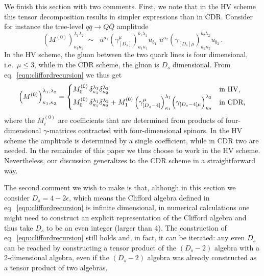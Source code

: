 We finish this section with two comments. First, we note that in the
HV scheme this tensor decomposition results in simpler expressions
than in CDR. Consider for instance the tree-level $q\bar q\to Q\bar
Q$ amplitude
\begin{equation}
  \left(M^{(0)}\right)_{\kappa_1 \kappa_2}^{\lambda_1 \lambda_2}
  \;\sim\;\; 
  \bar u^{a_1}
  \left(
  \gamma_{[D_s]}^\mu
  \right)_{a_1 \kappa_1}^{b_1 \lambda_1}
  u_{b_1}
  \,\,
  \bar u^{a_2}
  \left(
  \gamma_{[D_s]\mu}
  \right)_{a_2 \kappa_2}^{b_2 \lambda_2}
  u_{b_2}
  \,.
\end{equation}
In the HV scheme, the gluon between the two quark lines is
four dimensional, i.e.\  $\mu\leq3$, while
in the CDR scheme, the gluon is $D_s$ dimensional.
From eq.~\eqref{eqn:cliffordrecursion} we thus get
\begin{equation}
  \label{eq:HVvsCDR}
  \left(M^{(0)}\right)_{\kappa_1,\kappa_2}^{\lambda_1,\lambda_2}
  =
  \begin{cases}
    M^{(0)}_{0}\, \delta_{\kappa_1}^{\lambda_1}
    \delta_{\kappa_2}^{\lambda_2}& \textrm{in HV,}\\
    M^{(0)}_{0}\, \delta_{\kappa_1}^{\lambda_1}
    \delta_{\kappa_2}^{\lambda_2}+
    M^{(0)}_{1}\,\Bigl(\gamma_{[D_s-4]}^{\mu}\Bigl)_{\kappa_1}^
    {\lambda_1}
    \Bigl(\gamma_{[D_s-4]\mu}\Bigl)_{\kappa_2}^{\lambda_2}
    &\textrm{in CDR,}
  \end{cases}
\end{equation}
where the $M_i^{(0)}$ are coefficients that are determined from
products of four-dimensional $\gamma$-matrices contracted with
four-dimensional spinors.
In the HV scheme the amplitude is
determined by a single coefficient, 
while in CDR two are needed. In the
remainder of this paper we thus choose to work in the HV scheme.
Nevertheless, our discussion
generalizes to the CDR scheme in a straightforward way.

The second comment we wish to make is that, 
although in this section we consider $D_s=4-2\epsilon$, which
means the Clifford algebra defined in 
eq.~\eqref{eqn:cliffordrecursion} is infinite dimensional, in
numerical calculations one might need to construct an explicit
representation of the Clifford algebra and thus
take $D_s$ to be an even integer (larger than 4).
The construction 
of eq.~\eqref{eqn:cliffordrecursion} still holds and, in fact, 
it can be iterated: any even $D_s$ can be reached
by constructing a tensor product of the
$(D_s-2)$ algebra with a 2-dimensional algebra, even if the 
$(D_s-2)$ algebra 
was already constructed as a tensor product of two
algebras.

